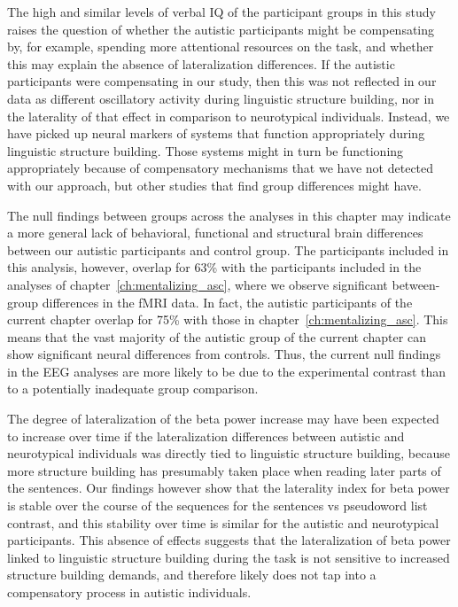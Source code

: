 The high and similar levels of verbal IQ of the participant groups in this study raises the question of whether the autistic participants might be compensating by, for example, spending more attentional resources on the task, and whether this may explain the absence of lateralization differences. If the autistic participants were compensating in our study, then this was not reflected in our data as different oscillatory activity during linguistic structure building, nor in the laterality of that effect in comparison to neurotypical individuals. Instead, we have picked up neural markers of systems that function appropriately during linguistic structure building. Those systems might in turn be functioning appropriately because of compensatory mechanisms that we have not detected with our approach, but other studies that find group differences might have.

The null findings between groups across the analyses in this chapter may indicate a more general lack of behavioral, functional and structural brain differences between our autistic participants and control group. The participants included in this analysis, however, overlap for 63\% with the participants included in the analyses of chapter~\ref{ch:mentalizing_asc}, where we observe significant between-group differences in the fMRI data. In fact, the autistic participants of the current chapter overlap for 75\% with those in chapter~\ref{ch:mentalizing_asc}. This means that the vast majority of the autistic group of the current chapter can show significant neural differences from controls. Thus, the current null findings in the EEG analyses are more likely to be due to the experimental contrast than to a potentially inadequate group comparison.

The degree of lateralization of the beta power increase may have been expected to increase over time if the lateralization differences between autistic and neurotypical individuals was directly tied to linguistic structure building, because more structure building has presumably taken place when reading later parts of the sentences. Our findings however show that the laterality index for beta power is stable over the course of the sequences for the sentences vs pseudoword list contrast, and this stability over time is similar for the autistic and neurotypical participants. This absence of effects suggests that the lateralization of beta power linked to linguistic structure building during the task is not sensitive to increased structure building demands, and therefore likely does not tap into a compensatory process in autistic individuals. 

